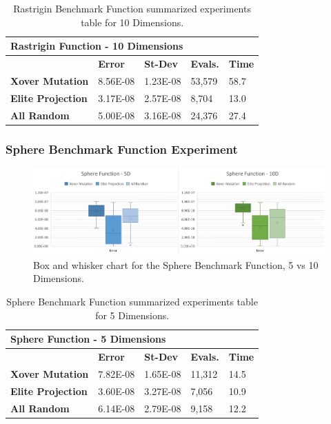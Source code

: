 \documentclass[graybox]{svmult}
\begin{document}
    \begin{table}[]
        \scriptsize
        \centering
        \caption{Rastrigin Benchmark Function summarized experiments table for 10 Dimensions.}\label{tab.fun_rastrigin10}
        \begin{tabular}{@{}lllll@{}}
        \toprule
        \multicolumn{5}{l}{\textbf{Rastrigin Function - 10   Dimensions}} \\ \midrule
        & \textbf{Error} & \textbf{St-Dev} & \textbf{Evals.} & \textbf{Time} \\
        \textbf{Xover Mutation} & 8.56E-08 & 1.23E-08 & 53,579 & 58.7 \\
        \textbf{Elite Projection} & 3.17E-08 & 2.57E-08 & 8,704 & 13.0 \\
        \textbf{All Random} & 5.00E-08 & 3.16E-08 & 24,376 & 27.4 \\ \bottomrule
        \end{tabular}
        \end{table}


\subsubsection{Sphere Benchmark Function Experiment}

    \begin{figure}
        \includegraphics[width=\linewidth, frame]{img/fig_fun_sphere.pdf}
        \caption{Box and whisker chart for the Sphere Benchmark Function, 5 vs 10 Dimensions.} \label{fig.fun_sphere}
        \end{figure}

    \begin{table}[]
        \scriptsize
        \centering
        \caption{Sphere Benchmark Function summarized experiments table for 5 Dimensions.}\label{tab.fun_sphere5}
        \begin{tabular}{@{}lllll@{}}
        \toprule
        \multicolumn{5}{l}{\textbf{Sphere Function - 5 Dimensions}} \\ \midrule
        & \textbf{Error} & \textbf{St-Dev} & \textbf{Evals.} & \textbf{Time} \\
        \textbf{Xover Mutation} & 7.82E-08 & 1.65E-08 & 11,312 & 14.5 \\
        \textbf{Elite Projection} & 3.60E-08 & 3.27E-08 & 7,056 & 10.9 \\
        \textbf{All Random} & 6.14E-08 & 2.79E-08 & 9,158 & 12.2 \\ \bottomrule
        \end{tabular}
        \end{table}
\end{document}
